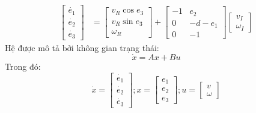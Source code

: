           \begin{align}
               \begin{bmatrix}
                    \dot{e_1} \\
                    \dot{e_2} \\
                    \dot{e_3}
                    \end{bmatrix} &= \begin{bmatrix}
                    v_R \cos e_3 \\
                    v_R \sin e_3 \\
                    \omega_R
                    \end{bmatrix} + \begin{bmatrix}
                    -1 & e_2 \\
                    0 & -d - e_1 \\
                    0 & -1
                    \end{bmatrix} \begin{bmatrix}
                    v_I \\
                    \omega_I
               \end{bmatrix}  
               \label{c6_e2}             
          \end{align}
          \hspace*{0.6cm}Hệ được mô tả bởi không gian trạng thái:
          \begin{equation}
               \dot{x} = Ax + Bu 
               \label{c6_e3}
          \end{equation}
          \hspace*{0.6cm}Trong đó:
          \begin{equation*}
               \dot{x} = \begin{bmatrix}
                    \dot{e_1} \\
                    \dot{e_2} \\
                    \dot{e_3}
               \end{bmatrix};
               x = \begin{bmatrix}
                    e_1 \\
                    e_2 \\
                    e_3
               \end{bmatrix}; 
               u = \begin{bmatrix}
                    v \\ 
                    \omega
               \end{bmatrix}
          \end{equation*}
